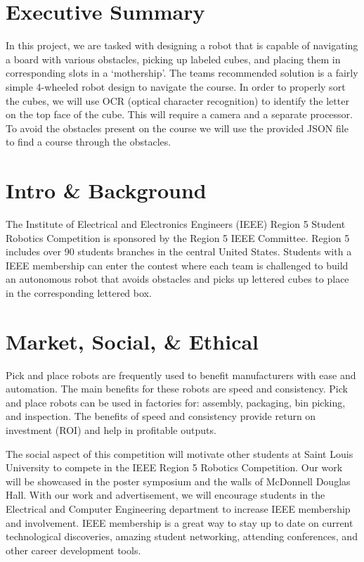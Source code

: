 \documentclass[12pt]{article}
\begin{document}
\section{Executive Summary}

In this project, we are tasked with designing a robot that is capable of navigating a board with various obstacles, picking up labeled cubes, and placing them in corresponding slots in a ‘mothership’. The teams recommended solution is a fairly simple 4-wheeled robot design to navigate the course. In order to properly sort the cubes, we will use OCR (optical character recognition) to identify the letter on the top face of the cube. This will require a camera and a separate processor. To avoid the obstacles present on the course we will use the provided JSON file to find a course through the obstacles.

\section{Intro \& Background} 

The Institute of Electrical and Electronics Engineers (IEEE) Region 5 Student Robotics Competition is sponsored by the Region 5 IEEE Committee. Region 5 includes over 90 students branches in the central United States. \cite{ieeer5} Students with a IEEE membership can enter the contest where each team is challenged to build an autonomous robot that avoids obstacles and picks up lettered cubes to place in the corresponding lettered box. \cite{robcomp}

\section{Market, Social, \& Ethical}

Pick and place robots are frequently used to benefit manufacturers with ease and automation. The main benefits for these robots are speed and consistency. Pick and place robots can be used in factories for: assembly, packaging, bin picking, and inspection. The benefits of speed and consistency provide return on investment (ROI) and help in profitable outputs. \cite{pickandplace}

The social aspect of this competition will motivate other students at Saint Louis University to compete in the IEEE Region 5 Robotics Competition. Our work will be showcased in the poster symposium and the walls of McDonnell Douglas Hall. With our work and advertisement, we will encourage students in the Electrical and Computer Engineering department to increase IEEE membership and involvement. IEEE membership is a great way to stay up to date on current technological discoveries, amazing student networking, attending conferences, and other career development tools. \cite{memval}
\end{document}
